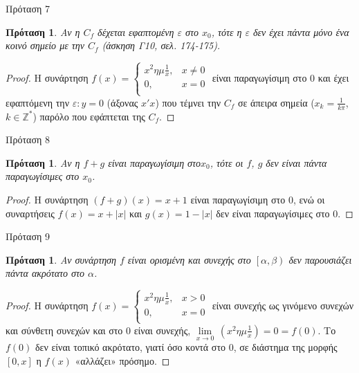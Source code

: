\documentclass[greek]{beamer}
\newtheorem{proposition}[theorem]{Πρόταση}
\begin{document}
\begin{frame}{Πρόταση 7}
 \begin{proposition}
  \normalfont Αν η ${{C}_{f}}$ δέχεται εφαπτομένη $\varepsilon $ στο ${{x}_{0}}$, τότε η $\varepsilon $ δεν έχει πάντα μόνο ένα κοινό σημείο με την ${{C}_{f}}$ (άσκηση Γ10, σελ. 174-175).
 \end{proposition}
 \begin{proof}
  Η συνάρτηση $f\left( x \right)=\left\{ \begin{array}{*{35}{l}}
    {{x}^{2}}\eta \mu \frac{1}{x}, & x\ne 0 \\
    0,                             & x=0    \\
   \end{array} \right.$ είναι παραγωγίσιμη στο $0$ και έχει εφαπτόμενη την $\varepsilon :y=0$ (άξονας $x'x$) που τέμνει την ${{C}_{f}}$ σε άπειρα σημεία (${{x}_{k}}=\frac{1}{k\pi }$, $k\in {{\mathbb{Z}}^{*}}$) παρόλο που εφάπτεται της ${{C}_{f}}$.
 \end{proof}
\end{frame}

\begin{frame}{Πρόταση 8}
 \begin{proposition}
  \normalfont Αν η $f+g$ είναι παραγωγίσιμη στο${{x}_{0}}$, τότε οι $f$, $g$ δεν είναι πάντα παραγωγίσιμες στο ${{x}_{0}}$.
 \end{proposition}
 \begin{proof}
  H συνάρτηση $\left( f+g \right)\left( x \right)=x+1$ είναι παραγωγίσιμη στο $0$, ενώ οι συναρτήσεις $f\left( x \right)=x+\left| x \right|$ και $g\left( x \right)=1-\left| x \right|$ δεν είναι παραγωγίσιμες στο $0$.
 \end{proof}
\end{frame}

\begin{frame}{Πρόταση 9}
 \begin{proposition}
  \normalfont Aν συνάρτηση $f$ είναι ορισμένη και συνεχής στο $\left[ \alpha ,\beta  \right)$ δεν παρουσιάζει πάντα ακρότατο στο $\alpha $.
 \end{proposition}
 \begin{proof}
  H συνάρτηση $f\left( x \right)=\left\{ \begin{array}{*{35}{l}}
    {{x}^{2}}\eta \mu \frac{1}{x}, & x > 0 \\      0, & x=0  \\
   \end{array} \right.$ είναι συνεχής ως γινόμενο συνεχών και σύνθετη συνεχών και στο $0$ είναι συνεχής, $\underset{x\to 0}{\mathop{\lim }}\,\left( {{x}^{2}}\eta \mu \frac{1}{x} \right)=0=f\left( 0 \right)$. Το $f\left( 0 \right)$ δεν είναι τοπικό ακρότατο, γιατί όσο κοντά στο $0$, σε διάστημα της μορφής
  $\left[ 0,x \right]$ η $f\left( x \right)$ «αλλάζει» πρόσημο.
 \end{proof}
\end{frame}
\end{document}

